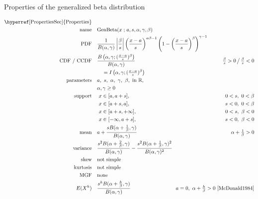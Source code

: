 

\begin{table*}[tp]
\caption[Generalized beta distribution-- Properties]{Properties of the generalized beta distribution}
 \begin{align*}
 \text{\hyperref[PropertiesSec]{Properties}}  \quad& \\
\text{name} \quad & \text{GenBeta}(x\given a,s,\alpha, \gamma,\beta) 
\\
\text{PDF}\quad &   \frac{1}{B(\alpha, \gamma)} \left|\frac{\beta}{s}\right|
\left(\frac{x-a}{s} \right)^{\alpha \beta -1} \left(1-\left(\frac{x-a}{s}\right)^\beta\right)^{\gamma -1}
\checked
\hspace{-8em}
\\
\text{CDF / CCDF} \quad  &   \frac{B\left( \alpha,\gamma; (\tfrac{x-a}{s})^\beta  \right)}{B(\alpha,\gamma)}
\checked
& \tfrac{\beta}{s} >0 \,\big/ \, \tfrac{\beta}{s} <0
\\ & \quad = I\left(  \alpha,\gamma; (\tfrac{x-a}{s})^\beta \right) \checked
\\ 
\text{parameters}\quad &   a,\ s,\ \alpha,\ \gamma,\ \beta, \text{ in } \Real, \\ &  \alpha,\gamma\geq0
\\
\text{support} \quad 
&   \ x \in [a,a+s],  \quad & 0<s,\ 0<\beta  \checked
 \\ 	 		 & \ x\in[a+s,a],  \quad & s<0,\ 0<\beta   \checked
 \\  			 & \ x\in[a+s,+\infty], \quad  & 0<s,\ \beta<0  \checked
 \\  			& \ x\in[-\infty,a+s], \quad & s<0,\ \beta<0 \checked
\\
\text{mean} \quad  &   a+ \frac{s B(\alpha+\tfrac{1}{\beta},\gamma) }{B(\alpha,\gamma)}  \quad & \alpha+\tfrac{1}{\beta} >0
\checked
\\
\text{variance} \quad  & \frac{s^2 B(\alpha+\tfrac{2}{\beta},\gamma) }{B(\alpha,\gamma)} -\frac{s^2 B(\alpha+\tfrac{1}{\beta},\gamma)^2 }{B(\alpha,\gamma)^2} \checked
\\
\text{skew} \quad  &   \text{not simple}
\\
\text{kurtosis} \quad  &   \text{not simple}
\\
\text{MGF} \quad  &  \text{none} %
\\
E(X^h) \quad & \frac{s^h B(\alpha+\tfrac{h}{\beta},\gamma) }{B(\alpha,\gamma)}  \qquad  & \!\!a=0,\ \alpha+\tfrac{h}{\beta} >0
\ \text{\cite{McDonald1984}} \checked
\end{align*}
\end{table*}

